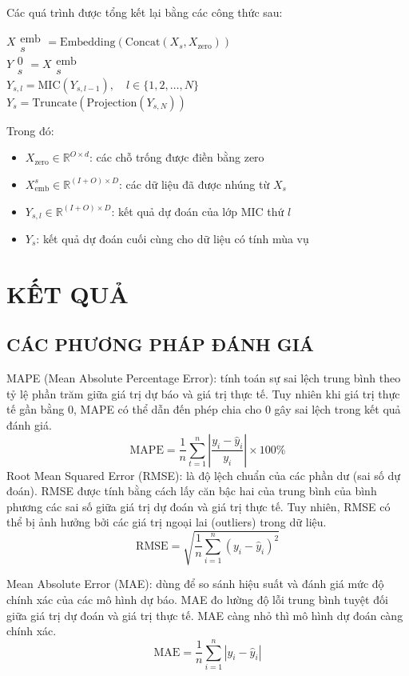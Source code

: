 \documentclass[conference]{IEEEtran}
\begin{document}
Các quá trình được tổng kết lại bằng các công thức sau:
\begin{center}
\(X{\substack{\text{emb}\\s}}{} = {\text{Embedding}}(\text{Concat}(X_s, X_{\text{zero}}))\) \\
\(Y{\substack{\text{0}\\s}}{} = X{\substack{\text{emb}\\s}}{}\)\\
\(Y_{s,l} = \text{MIC}(Y_{s,l-1}), \quad l \in \{1, 2, \ldots, N\}\)\\
\(Y_s = \text{Truncate}(\text{Projection}(Y_{s,N}))\)
\end{center}
Trong đó:
\begin{itemize}
    \item \(X_{\text{zero}} \in \mathbb{R}^{O \times d}\): các chỗ trống được điền bằng zero
    \item \(X_{\text{emb}}^s \in \mathbb{R}^{(I+O) \times D}\): các dữ liệu đã được nhúng từ \(X_s\)
    \item \(Y_{s,l} \in \mathbb{R}^{(I+O) \times D}\): kết quả dự đoán của lớp MIC thứ \(l\)
    \item \(Y_s\): kết quả dự đoán cuối cùng cho dữ liệu có tính mùa vụ
\end{itemize}


\section{KẾT QUẢ}
\subsection{CÁC PHƯƠNG PHÁP ĐÁNH GIÁ}
MAPE (Mean Absolute Percentage Error): tính toán sự sai lệch trung bình theo tỷ lệ phần trăm giữa giá trị dự báo và giá trị thực tế. Tuy nhiên khi giá trị thực tế gần bằng 0, MAPE có thể dẫn đến phép chia cho 0 gây sai lệch trong kết quả đánh giá.
\[\text{MAPE} = \frac{1}{n} \sum_{t=1}^{n} \left| \frac{y_i - \hat{y}_i}{y_i} \right| \times 100\%\]
Root Mean Squared Error (RMSE): là độ lệch chuẩn của các phần dư (sai số dự đoán). RMSE được tính bằng cách lấy căn bậc hai của trung bình của bình phương các sai số giữa giá trị dự đoán và giá trị thực tế. Tuy nhiên, RMSE có thể bị ảnh hưởng bởi các giá trị ngoại lai (outliers) trong dữ liệu. 
\[\text{RMSE} = \sqrt{\frac{1}{n} \sum_{i=1}^{n} (y_i - \hat{y}_i)^2}\]

Mean Absolute Error (MAE): dùng để so sánh hiệu suất và đánh giá mức độ chính xác của các mô hình dự báo. MAE đo lường độ lỗi trung bình tuyệt đối giữa giá trị dự đoán và giá trị thực tế. MAE càng nhỏ thì mô hình dự đoán càng chính xác.
\[\text{MAE} = \frac{1}{n} \sum_{i=1}^{n} |y_i - \hat{y}_i|\]
\end{document}
